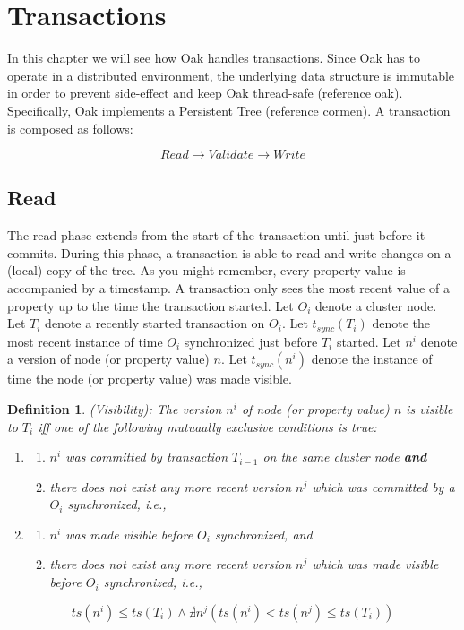 \documentclass[abstracton,12pt]{scrreprt}
\newtheorem{definition}{Definition}
\begin{document}
\section{Transactions}

In this chapter we will see how Oak handles transactions.
Since Oak has to operate in a distributed environment, the underlying data structure is immutable in order to prevent side-effect and keep Oak thread-safe (reference oak).
Specifically, Oak implements a Persistent Tree (reference cormen).
A transaction is composed as follows:

$$
Read \longrightarrow Validate \longrightarrow Write
$$

\subsection{Read} \label{transaction-read}

The read phase extends from the start of the transaction until just before it commits.
During this phase, a transaction is able to read and write changes on a (local) copy of the tree.
As you might remember, every property value is accompanied by a timestamp.
A transaction only sees the most recent value of a property up to the time the transaction started.
Let $O_i$ denote a cluster node.
Let $T_i$ denote a recently started transaction on $O_i$.
Let $t_{sync}(T_i)$ denote the most recent instance of time $O_i$ synchronized just before $T_i$ started.
Let $n^i$ denote a version of node (or property value) $n$.
Let $t_{sync}(n^i)$ denote the instance of time the node (or property value) was made visible.
\begin{definition}
    (Visibility): The version $n^i$ of node (or property value) $n$ is visible to $T_i$ iff one of the following mutuaally exclusive conditions is true:
    \begin{enumerate}
        \item 
            \begin{enumerate}
                \item $n^i$ was committed by transaction $T_{i-1}$ on the same cluster node \textbf{and}
                \item there does not exist any more recent version $n^j$ which was committed by a $O_i$ synchronized, i.e.,    
            \end{enumerate}
        \item
            \begin{enumerate}
                \item $n^i$ was made visible before $O_i$ synchronized, and
                \item there does not exist any more recent version  $n^j$ which was made visible before $O_i$ synchronized, i.e.,    
            \end{enumerate}
        
    \end{enumerate}
$$
ts(n^i) \leq ts(T_i) \land \nexists n^j(ts(n^i) < ts(n^j) \leq ts(T_i))
$$
\end{definition}
\end{document}
